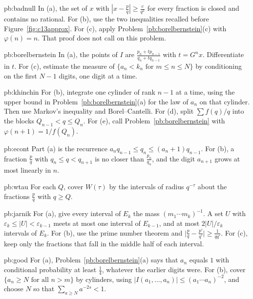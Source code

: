 \begin{hint}{pb:badnull}
In (a), the set of $x$ with $|x-\frac pq|\ge\frac c{q^2}$ for every fraction is closed and contains no rational. For (b), use the two inequalities recalled before Figure~\ref{fig:c13approx}. For (c), apply Problem~\ref{pb:borelbernstein}(c) with $\varphi(n)=n$. That proof does not call on this problem.
\end{hint}

\begin{hint}{pb:borelbernstein}
In (a), the points of $I$ are $\frac{p_n+tp_{n-1}}{q_n+tq_{n-1}}$ with $t=G^nx$. Differentiate in $t$. For (c), estimate the measure of $\{a_n<k_n\text{ for }m\le n\le N\}$ by conditioning on the first $N-1$ digits, one digit at a time.
\end{hint}

\begin{hint}{pb:khinchin}
For (b), integrate one cylinder of rank $n-1$ at a time, using the upper bound in Problem~\ref{pb:borelbernstein}(a) for the law of $a_n$ on that cylinder. Then use Markov's inequality and Borel--Cantelli. For (d), split $\sum f(q)/q$ into the blocks $Q_{n-1}<q\le Q_n$. For (e), call Problem~\ref{pb:borelbernstein} with $\varphi(n+1)=1/f(Q_n)$.
\end{hint}

\begin{hint}{pb:econt}
Part (a) is the recurrence $a_nq_{n-1}\le q_n\le(a_n+1)q_{n-1}$. For (b), a fraction $\frac pq$ with $q_n\le q<q_{n+1}$ is no closer than $\frac{p_n}{q_n}$, and the digit $a_{n+1}$ grows at most linearly in $n$.
\end{hint}

\begin{hint}{pb:wtau}
For each $Q$, cover $W(\tau)$ by the intervals of radius $q^{-\tau}$ about the fractions $\frac pq$ with $q\ge Q$.
\end{hint}

\begin{hint}{pb:jarnik}
For (a), give every interval of $E_k$ the mass $(m_1\cdots m_k)^{-1}$. A set $U$ with $\varepsilon_k\le|U|<\varepsilon_{k-1}$ meets at most one interval of $E_{k-1}$, and at most $2|U|/\varepsilon_k$ intervals of $E_k$. For (b), use the prime number theorem and $\bigl|\frac pq-\frac{p'}{q'}\bigr|\ge\frac1{qq'}$. For (c), keep only the fractions that fall in the middle half of each interval.
\end{hint}

\begin{hint}{pb:good}
For (a), Problem~\ref{pb:borelbernstein}(a) says that $a_n$ equals $1$ with conditional probability at least $\frac14$, whatever the earlier digits were. For (b), cover $\{a_n\ge N\text{ for all }n>m\}$ by cylinders, using $|I(a_1,\dots,a_n)|\le(a_1\cdots a_n)^{-2}$, and choose $N$ so that $\sum_{a\ge N}a^{-2s}<1$.
\end{hint}

